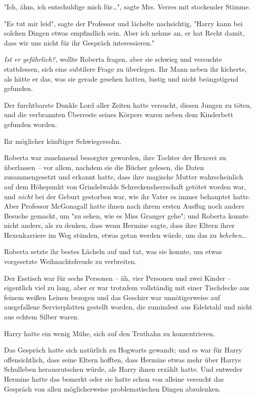 {"Ich, ähm, ich entschuldige mich für…", sagte Mrs. Verres mit stockender Stimme.

"Es tut mir leid", sagte der Professor und lächelte nachsichtig, "Harry kann bei solchen Dingen etwas empfindlich sein. Aber ich nehme an, er hat Recht damit, dass wir uns nicht für ihr Gespräch interessieren."

\emph{Ist er gefährlich?,} wollte Roberta fragen, aber sie schwieg und versuchte stattdessen, sich eine subtilere Frage zu überlegen. Ihr Mann neben ihr kicherte, als hätte er das, was sie gerade gesehen hatten, lustig und nicht beängstigend gefunden.

Der furchtbarste Dunkle Lord aller Zeiten hatte versucht, diesen Jungen zu töten, und die verbrannten Überreste seines Körpers waren neben dem Kinderbett gefunden worden.

Ihr möglicher künftiger Schwiegersohn.

Roberta war zunehmend besorgter geworden, ihre Tochter der Hexerei zu überlassen -- vor allem, nachdem sie die Bücher gelesen, die Daten zusammengesetzt und erkannt hatte, dass ihre magische Mutter wahrscheinlich auf dem Höhepunkt von Grindelwalds Schreckensherrschaft getötet worden war, und \emph{nicht} bei der Geburt gestorben war, wie ihr Vater es immer behauptet hatte. Aber Professor McGonagall hatte ihnen nach ihrem ersten Ausflug noch andere Besuche gemacht, um "zu sehen, wie es Miss Granger gehe"; und Roberta konnte nicht anders, als zu denken, dass wenn Hermine sagte, dass ihre Eltern ihrer Hexenkarriere im Weg stünden, etwas getan werden würde, um das zu \emph{beheben}…

Roberta setzte ihr bestes Lächeln auf und tat, was sie konnte, um etwas vorgesetzte Weihnachtsfreude zu verbreiten.

Der Esstisch war für sechs Personen -- äh, vier Personen und zwei Kinder -- eigentlich viel zu lang, aber er war trotzdem vollständig mit einer Tischdecke aus feinem weißen Leinen bezogen und das Geschirr war unnötigerweise auf ausgefallene Servierplatten gestellt worden, die zumindest aus Edelstahl und nicht aus echtem Silber waren.

Harry hatte ein wenig Mühe, sich auf den Truthahn zu konzentrieren.

Das Gespräch hatte sich natürlich zu Hogwarts gewandt; und es war für Harry offensichtlich, dass seine Eltern hofften, dass Hermine etwas mehr über Harrys Schulleben herausrutschen würde, als Harry ihnen erzählt hatte. Und entweder Hermine hatte das bemerkt oder sie hatte schon von alleine versucht das Gespräch von allen möglicherweise problematischen Dingen abzulenken.

}
